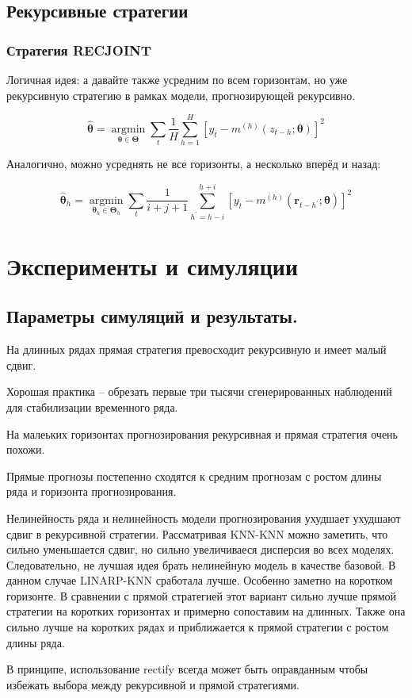 \documentclass[a4paper,12pt]{article}
\begin{document}
\subsection{Рекурсивные стратегии}

\subsubsection{Стратегия RECJOINT}

Логичная идея: а давайте также усредним по всем горизонтам, но уже рекурсивную стратегию в рамках модели, прогнозирующей рекурсивно. 

\[
\hat{\boldsymbol{\theta}}=\underset{\boldsymbol{\theta} \in \boldsymbol{\Theta}}{\operatorname{argmin}} \sum_{t} \frac{1}{H} \sum_{h=1}^{H}\left[y_{t}-m^{(h)}\left(z_{t-h} ; \boldsymbol{\theta}\right)\right]^{2}
\]

Аналогично, можно усреднять не все горизонты, а несколько вперёд и назад:

\[
\hat{\boldsymbol{\theta}}_{h}=\underset{\boldsymbol{\theta}_{h} \in \boldsymbol{\Theta}_{h}}{\operatorname{argmin}} \sum_{t} \frac{1}{i+j+1} \sum_{h^{\prime}=h-i}^{h+i}\left[y_{t}-m^{(h)}\left(\boldsymbol{r}_{t-h^{\prime}} ; \boldsymbol{\theta}\right)\right]^{2}
\]


\section{Эксперименты и симуляции}


\subsection{Параметры симуляций и результаты.}

На длинных рядах прямая стратегия превосходит рекурсивную и имеет малый сдвиг.

Хорошая практика -- обрезать первые три тысячи сгенерированных наблюдений для стабилизации временного ряда.

На малеьких горизонтах прогнозирования рекурсивная и прямая стратегия очень похожи.

Прямые прогнозы постепенно сходятся к средним прогнозам с ростом длины ряда и горизонта прогнозирования. 



Нелинейность ряда и нелинейность модели прогнозирования ухудшает ухудшают сдвиг в рекурсивной стратегии. Рассматривая KNN-KNN можно заметить, что сильно уменьшается сдвиг, но сильно увеличиваеся дисперсия во всех моделях. Следовательно, не лучшая идея брать нелинейную модель в качестве базовой. В данном случае LINARP-KNN сработала лучше. Особенно заметно на коротком горизонте. В сравнении с прямой стратегией этот вариант сильно лучше прямой стратегии на коротких горизонтах и примерно сопоставим на длинных. Также она сильно лучше на коротких рядах и приближается к прямой стратегии с ростом длины ряда.

В принципе, использование rectify всегда может быть оправданным чтобы избежать выбора между рекурсивной и прямой стратегиями.
\end{document}
